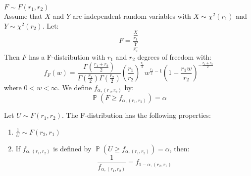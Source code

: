 \documentclass{huhtakm-template-book-v2}
\DeclareMathOperator{\prob}{\mathbb{P}}
\begin{document}
\newpage
\begin{eg} $F\sim F(r_{1},r_{2})$\\
	Assume that $X$ and $Y$ are independent random variables with $X\sim\chi^{2}(r_{1})$ and $Y\sim\chi^{2}(r_{2})$. Let:
	\begin{equation*}
		F=\frac{\frac{X}{r_{1}}}{\frac{Y}{r_{2}}}
	\end{equation*}
	Then $F$ has a F-distribution with $r_{1}$ and $r_{2}$ degrees of freedom with:
	\begin{equation*}
		f_{F}(w)=\frac{\Gamma\left(\frac{r_{1}+r_{2}}{2}\right)}{\Gamma\left(\frac{r_{1}}{2}\right)\Gamma\left(\frac{r_{2}}{2}\right)}\left(\frac{r_{1}}{r_{2}}\right)^{\frac{r_{1}}{2}}w^{\frac{r_{1}}{2}-1}\left(1+\frac{r_{1}w}{r_{2}}\right)^{-\frac{r_{1}+r_{2}}{2}}
	\end{equation*}
	where $0<w<\infty$. We define $f_{\alpha,(r_{1},r_{2})}$ by:
	\begin{equation*}
		\prob(F\geq f_{\alpha,(r_{1},r_{2})})=\alpha
	\end{equation*}
\end{eg}
\begin{lem}
	Let $U\sim F(r_{1},r_{2})$. The F-distribution has the following properties:
	\begin{enumerate}
		\item $\frac{1}{U}\sim F(r_{2},r_{1})$
		\item If $f_{\alpha,(r_{1},r_{2})}$ is defined by $\prob(U\geq f_{\alpha,(r_{1},r_{2})})=\alpha$, then:
		\begin{equation*}
			\frac{1}{f_{\alpha,(r_{1},r_{2})}}=f_{1-\alpha,(r_{2},r_{1})}
		\end{equation*}
	\end{enumerate}
\end{lem}
\end{document}

